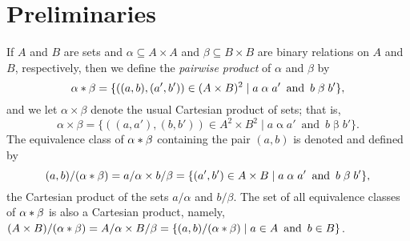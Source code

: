 \section{Preliminaries}
If $A$ and $B$ are sets and  $\alpha \subseteq A\times A$ and $\beta \subseteq B\times B$
are binary relations on $A$ and $B$, respectively, then 
we define
the \emph{pairwise product} of $\alpha$ and $\beta$ by
\begin{equation}
\label{eq:pair-product}
\alpha \ast \beta = \{((a, b), (a', b')) 
\in (A\times B)^2 \mid a\mathrel{\alpha} a'\, \text{ and } \,  b\mathrel{\beta} b'\},
\end{equation}
and we let $\alpha \times \beta$ denote the usual Cartesian product of sets; that is,
\begin{equation}
\label{eq:set-product}
\alpha \times \beta = \{((a, a'), (b, b')) 
\in A^2\times B^2 \mid a\mathrel{\alpha} a' \, \text{ and } \, b\mathrel{\beta} b'\}.
\end{equation}
The equivalence class of $\alpha \ast \beta$ containing the pair
$(a, b)$ is denoted and defined by %
\[(a,b)/(\alpha \ast \beta) = a/\alpha \times b/\beta= 
    \{(a', b') \in A\times B \mid a\mathrel{\alpha} a' \, \text{ and } \,  b\mathrel{\beta} b'\},
    \]
the Cartesian product of the sets $a/\alpha$ and $b/\beta$.
The set of all equivalence classes of $\alpha \ast \beta$ is also a Cartesian product, namely,
$(A\times B)/(\alpha \ast \beta) =
A/\alpha \times B/\beta  = \{(a, b)/(\alpha \ast \beta) \mid a\in A \, \text{ and } \, b \in B\}$.

